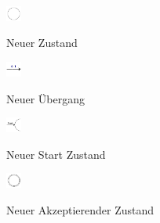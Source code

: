 \begin{figure}[h!]
  \begin{center}
    \begin{minipage}[t]{1cm}
      \includegraphics[width=0.5cm]{../images/machineToolbar/state.png}
    \end{minipage}
    \begin{minipage}[t]{5cm}
      Neuer Zustand
    \end{minipage}
  \end{center}
\end{figure} 

\begin{figure}[h!]
  \begin{center}
    \begin{minipage}[t]{1cm}
      \includegraphics[width=0.5cm]{../images/machineToolbar/transition.png}
    \end{minipage}
    \begin{minipage}[t]{5cm}
      Neuer Übergang
    \end{minipage}
  \end{center}
\end{figure} 

\begin{figure}[h!]
  \begin{center}
    \begin{minipage}[t]{1cm}
      \includegraphics[width=0.5cm]{../images/machineToolbar/start.png}
    \end{minipage}
    \begin{minipage}[t]{5cm}
      Neuer Start Zustand
    \end{minipage}
  \end{center}
\end{figure}

\begin{figure}[h!]
  \begin{center}
    \begin{minipage}[t]{1cm}
      \includegraphics[width=0.5cm]{../images/machineToolbar/final.png}
    \end{minipage}
    \begin{minipage}[t]{5cm}
      Neuer Akzeptierender Zustand
    \end{minipage}
  \end{center}
\end{figure} 


